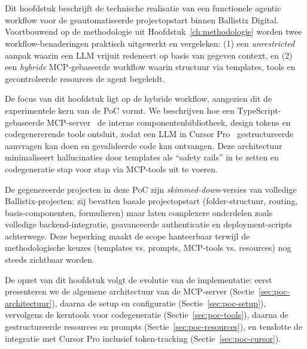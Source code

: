 
\chapter{}%
\label{ch:poc_hybrid}

\section{}
\label{sec:poc-inleiding}

Dit hoofdstuk beschrijft de technische realisatie van een functionele agentic workflow voor de geautomatiseerde projectopstart binnen Ballistix Digital. Voortbouwend op de methodologie uit Hoofdstuk~\ref{ch:methodologie} worden twee workflow-benaderingen praktisch uitgewerkt en vergeleken: (1) een \textit{unrestricted} aanpak waarin een LLM vrijuit redeneert op basis van gegeven context, en (2) een \textit{hybride} MCP-gebaseerde workflow waarin structuur via templates, tools en gecontroleerde resources de agent begeleidt.

De focus van dit hoofdstuk ligt op de hybride workflow, aangezien dit de experimentele kern van de PoC vormt. We beschrijven hoe een TypeScript-gebaseerde MCP-server~\autocite{modelcontextprotocol2026} de interne componentenbibliotheek, design tokens en codegenererende tools ontsluit, zodat een LLM in Cursor Pro~\autocite{CursorProUsage2026} gestructureerde aanvragen kan doen en gevalideerde code kan ontvangen. Deze architectuur minimaliseert hallucinaties door templates als ``safety rails'' in te zetten en codegeneratie stap voor stap via MCP-tools uit te voeren.

De gegenereerde projecten in deze PoC zijn \textit{skimmed-down}-versies van volledige Ballistix-projecten: zij bevatten basale projectopstart (folder-structuur, routing, basis-componenten, formulieren) maar laten complexere onderdelen zoals volledige backend-integratie, geavanceerde authenticatie en deployment-scripts achterwege. Deze beperking maakt de scope hanteerbaar terwijl de methodologische keuzes (templates vs. prompts, MCP-tools vs. resources) nog steeds zichtbaar worden.

De opzet van dit hoofdstuk volgt de evolutie van de implementatie: eerst presenteren we de algemene architectuur van de MCP-server (Sectie~\ref{sec:poc-architectuur}), daarna de setup en configuratie (Sectie~\ref{sec:poc-setup}), vervolgens de kerntools voor codegeneratie (Sectie~\ref{sec:poc-tools}), daarna de gestructureerde resources en prompts (Sectie~\ref{sec:poc-resources}), en tenslotte de integratie met Cursor Pro inclusief token-tracking (Sectie~\ref{sec:poc-cursor}).

